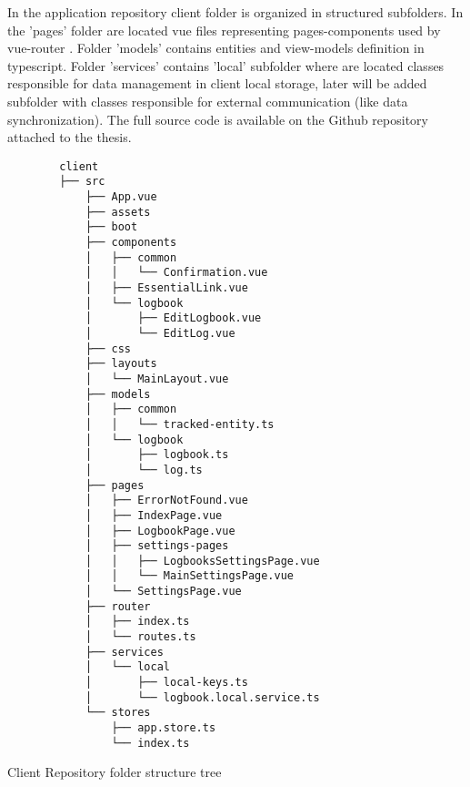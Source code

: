 In the application repository client folder is organized in structured subfolders. In the 'pages' folder are located vue files representing pages-components used by vue-router \autocite{VueRouter}. Folder 'models' contains entities and view-models definition in typescript. Folder 'services' contains 'local' subfolder where are located classes responsible for data management in client local storage, later will be added subfolder with classes responsible for external communication (like data synchronization). The full source code is available on the Github repository attached to the thesis.

\begin{listing}[H]
    \begin{verbatim}
        client
        ├── src
            ├── App.vue
            ├── assets
            ├── boot
            ├── components
            │   ├── common
            │   │   └── Confirmation.vue
            │   ├── EssentialLink.vue
            │   └── logbook
            │       ├── EditLogbook.vue
            │       └── EditLog.vue
            ├── css
            ├── layouts
            │   └── MainLayout.vue
            ├── models
            │   ├── common
            │   │   └── tracked-entity.ts
            │   └── logbook
            │       ├── logbook.ts
            │       └── log.ts
            ├── pages
            │   ├── ErrorNotFound.vue
            │   ├── IndexPage.vue
            │   ├── LogbookPage.vue
            │   ├── settings-pages
            │   │   ├── LogbooksSettingsPage.vue
            │   │   └── MainSettingsPage.vue
            │   └── SettingsPage.vue
            ├── router
            │   ├── index.ts
            │   └── routes.ts
            ├── services
            │   └── local
            │       ├── local-keys.ts
            │       └── logbook.local.service.ts
            └── stores
                ├── app.store.ts
                └── index.ts
    \end{verbatim}
\caption[]{Client Repository folder structure tree}
\end{listing}
